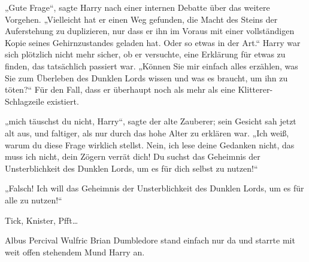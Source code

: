 „Gute Frage“, sagte Harry nach einer internen Debatte über das weitere Vorgehen. „Vielleicht hat er einen Weg gefunden, die Macht des Steins der Auferstehung zu duplizieren, nur dass er ihn im Voraus mit einer vollständigen Kopie seines Gehirnzustandes geladen hat. Oder so etwas in der Art.“ Harry war sich plötzlich nicht mehr sicher, ob er versuchte, eine Erklärung für etwas zu finden, das tatsächlich passiert war. „Können Sie mir einfach alles erzählen, was Sie zum Überleben des Dunklen Lords wissen und was es braucht, um ihn zu töten?“ Für den Fall, dass er überhaupt noch als mehr als eine Klitterer-Schlagzeile existiert.

„mich täuschst du nicht, Harry“, sagte der alte Zauberer; sein Gesicht sah jetzt alt aus, und faltiger, als nur durch das hohe Alter zu erklären war. „Ich weiß, warum du diese Frage wirklich stellst. Nein, ich lese deine Gedanken nicht, das muss ich nicht, dein Zögern verrät dich! Du suchst das Geheimnis der Unsterblichkeit des Dunklen Lords, um es für dich selbst zu nutzen!“

„Falsch! Ich will das Geheimnis der Unsterblichkeit des Dunklen Lords, um es für alle zu nutzen!“

\later

Tick, Knister, Pfft…

Albus Percival Wulfric Brian Dumbledore stand einfach nur da und starrte mit weit offen stehendem Mund Harry an.

